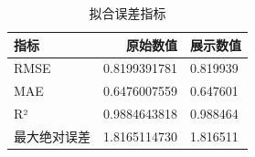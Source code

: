 \begin{table}[H]
\centering
\caption{拟合误差指标}
\label{tab:metrics}
\begin{tabular}{lrl}
\toprule
指标 & 原始数值 & 展示数值 \\
\midrule
RMSE & 0.8199391781 & 0.819939 \\
MAE & 0.6476007559 & 0.647601 \\
R² & 0.9884643818 & 0.988464 \\
最大绝对误差 & 1.8165114730 & 1.816511 \\
\bottomrule
\end{tabular}
\end{table}
